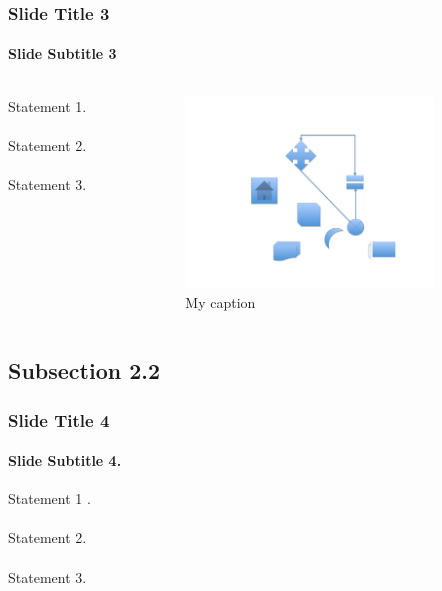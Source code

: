 \documentclass[xcolor={usenames,dvipsnames},hyperref={hyperindex,bookmarks}]{beamer}
\begin{document}
\begin{frame}
	\frametitle{Slide Title 3}
	\framesubtitle{Slide Subtitle 3}
	
	\begin{columns}[t]			%
		\begin{column}[T]{5cm}	%
		
		Statement 1. \\
		\ \\
		Statement 2. \\
		\ \\
		Statement 3.
		\end{column}
		
		\begin{column}[T]{5cm}	%
			\begin{figure}
			\centering
			\includegraphics[height=2in]{./pics/my_figure}
			\caption{My caption \cite{Petroski1992,Kopka2004}}
			\end{figure}
		\end{column}
	\end{columns}
\end{frame}

\subsection{Subsection 2.2}

\begin{frame}
	\frametitle{Slide Title 4}
	\framesubtitle{Slide Subtitle 4.}
	
	Statement 1 \cite{vanDongen2012}. \\
	\ \\
	Statement 2. \\
	\ \\
	Statement 3.
\end{frame}
\end{document}

